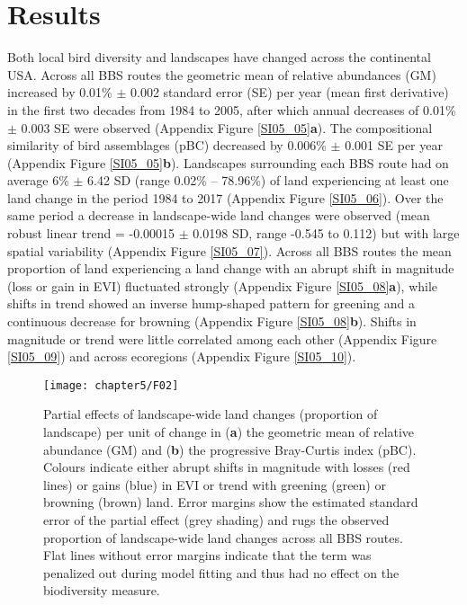 \section{Results}
\label{C05_03}

Both local bird diversity and landscapes have changed across the continental USA. Across all BBS routes the geometric mean of relative abundances (GM) increased by 0.01\% $\pm$ 0.002 standard error (SE) per year (mean first derivative) in the first two decades from 1984 to 2005, after which annual decreases of 0.01\% $\pm$ 0.003 SE were observed (Appendix Figure \ref{SI05_05}\textbf{a}). The compositional similarity of bird assemblages (pBC) decreased by 0.006\% $\pm$ 0.001 SE per year (Appendix Figure \ref{SI05_05}\textbf{b}). Landscapes surrounding each BBS route had on average 6\% $\pm$ 6.42 SD (range 0.02\% – 78.96\%) of land experiencing at least one land change in the period 1984 to 2017 (Appendix Figure \ref{SI05_06}). Over the same period a decrease in landscape-wide land changes were observed (mean robust linear trend = -0.00015 $\pm$ 0.0198 SD, range -0.545 to 0.112) but with large spatial variability (Appendix Figure \ref{SI05_07}). Across all BBS routes the mean proportion of land experiencing a land change with an abrupt shift in magnitude (loss or gain in EVI) fluctuated strongly (Appendix Figure \ref{SI05_08}\textbf{a}), while shifts in trend showed an inverse hump-shaped pattern for greening and a continuous decrease for browning (Appendix Figure \ref{SI05_08}\textbf{b}). Shifts in magnitude or trend were little correlated among each other (Appendix Figure \ref{SI05_09}) and across ecoregions (Appendix Figure \ref{SI05_10}).

\begin{figure}[htb]
\centering
\texttt{[image: chapter5/F02]}
\caption{ Partial effects of landscape-wide land changes (proportion of landscape) per unit of change in (\textbf{a}) the geometric mean of relative abundance (GM) and (\textbf{b}) the progressive Bray-Curtis index (pBC). Colours indicate either abrupt shifts in magnitude with losses (red lines) or gains (blue) in EVI or trend with greening (green) or browning (brown) land. Error margins show the estimated standard error of the partial effect (grey shading) and rugs the observed proportion of landscape-wide land changes across all BBS routes. Flat lines without error margins indicate that the term was penalized out during model fitting and thus had no effect on the biodiversity measure. }
\label{F05_02}
\end{figure}

